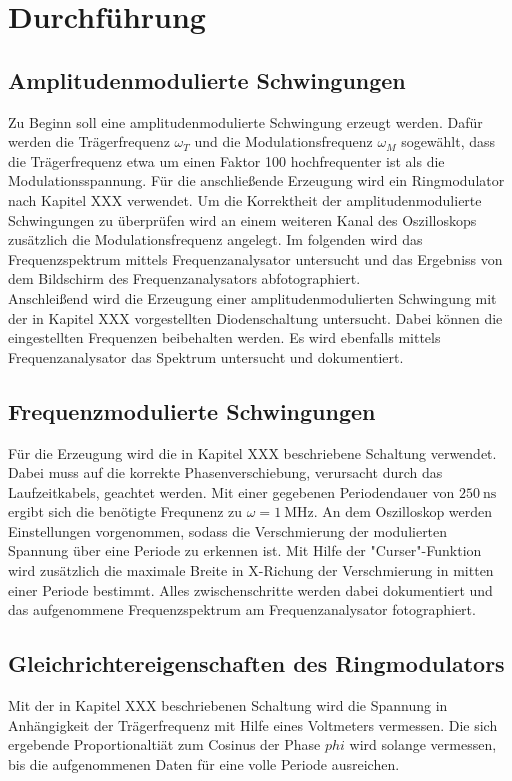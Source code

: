 \section{Durchführung}
\label{sec:Durchführung}

\subsection{Amplitudenmodulierte Schwingungen}
Zu Beginn soll eine amplitudenmodulierte Schwingung erzeugt werden. Dafür werden die Trägerfrequenz $\omega_T$ und die Modulationsfrequenz $\omega_M$ sogewählt, dass die Trägerfrequenz etwa um einen Faktor 100 hochfrequenter ist als die Modulationsspannung. Für die anschließende Erzeugung wird ein Ringmodulator nach Kapitel XXX verwendet. Um die Korrektheit der amplitudenmodulierte Schwingungen zu überprüfen wird an einem weiteren Kanal des Oszilloskops zusätzlich die Modulationsfrequenz angelegt. Im folgenden wird das Frequenzspektrum mittels Frequenzanalysator untersucht und das Ergebniss von dem Bildschirm des Frequenzanalysators abfotographiert.
\\
Anschleißend wird die Erzeugung einer amplitudenmodulierten Schwingung mit der in Kapitel XXX vorgestellten Diodenschaltung untersucht. Dabei können die eingestellten Frequenzen beibehalten werden. Es wird ebenfalls mittels Frequenzanalysator das Spektrum untersucht und dokumentiert.

\subsection{Frequenzmodulierte Schwingungen}
Für die Erzeugung wird die in Kapitel XXX beschriebene Schaltung verwendet. Dabei muss auf die korrekte Phasenverschiebung, verursacht durch das Laufzeitkabels, geachtet werden. Mit einer gegebenen Periodendauer von $\SI{250}{\ns}$ ergibt sich die benötigte Frequnenz zu $\omega=\SI{1}{\mega\hertz}$. An dem Oszilloskop werden Einstellungen vorgenommen, sodass die Verschmierung der modulierten Spannung über eine Periode zu erkennen ist. Mit Hilfe der "Curser"-Funktion wird zusätzlich die maximale Breite in X-Richung der Verschmierung in mitten einer Periode bestimmt. Alles zwischenschritte werden dabei dokumentiert und das aufgenommene Frequenzspektrum am Frequenzanalysator fotographiert.

\subsection{Gleichrichtereigenschaften des Ringmodulators}
Mit der in Kapitel XXX beschriebenen Schaltung wird die Spannung in Anhängigkeit der Trägerfrequenz mit Hilfe eines Voltmeters vermessen. Die sich ergebende Proportionaltiät zum Cosinus der Phase $phi$ wird solange vermessen, bis die aufgenommenen Daten für eine volle Periode ausreichen.

